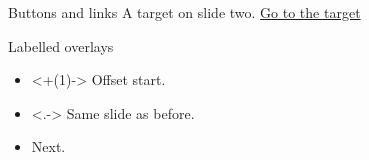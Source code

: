 \documentclass{beamer}
\begin{document}
\begin{frame}{Buttons and links}
  \hyperlink{transitions}{}
  \hypertarget<2>{target}{A target on slide two.}
  \pause
  \hyperlink{target<2>}{Go to the target}
\end{frame}
\begin{frame}{Labelled overlays}
  \begin{itemize}
    \item<+(1)-> Offset start.
    \item<.-> Same slide as before.
    \item<+-> Next.
  \end{itemize}
\end{frame}
\end{document}
